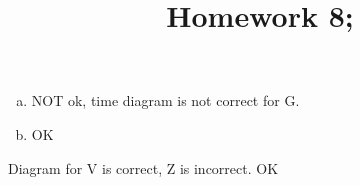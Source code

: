 \documentclass[10pt]{article} %
\title{Homework 8;
}
\begin{document}
\maketitle
{}
\begin{enumerate}[(a)]
  \item 
NOT ok, time diagram is not correct for G.
\item OK
\end{enumerate}
Diagram for V is correct, Z is incorrect.
OK
\end{document}
